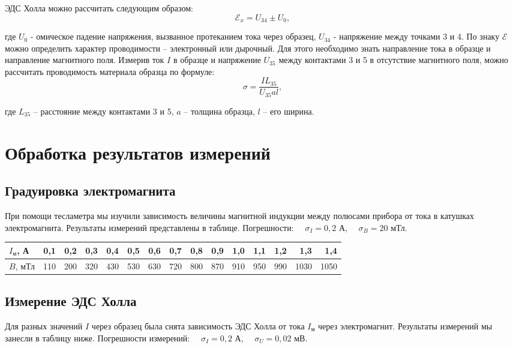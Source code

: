 \n
ЭДС Холла можно рассчитать следующим образом:
\[\mathcal{E}_x = U_{34} \pm U_0,\]

где $U_0$ - омическое падение напряжения, вызванное протеканием тока через образец, $U_{34}$ - напряжение между точками 3 и 4.
\n\n
По знаку $ \mathcal{E} $ можно определить характер проводимости -- электронный или дырочный. Для этого необходимо знать направление тока в образце и направление магнитного поля.
\n\n
Измерив ток $ I $ в образце и напряжение $ U_{35} $ между контактами 3 и 5 в отсутствие магнитного поля, можно рассчитать проводимость материала образца по формуле:
\begin{equation}\label{2}
\sigma = \frac{IL_{35}}{U_{35}al},
\end{equation}

где $ L_{35} $ -- расстояние между контактами 3 и 5, $ a $ -- толщина образца, $ l $ -- его ширина.

\section*{Обработка результатов измерений}

\subsection*{Градуировка электромагнита}

При помощи тесламетра мы изучили зависимость величины магнитной индукции между полюсами прибора от тока в катушках электромагнита. Результаты измерений представлены в таблице. Погрешности: $ \quad \sigma_{I} = 0,2$ А, $ \quad \sigma_{B} = 20$ мТл.

\begin{table}[H]
	\centering
	\begin{tabular}{|l|r|r|r|r|r|r|r|r|r|r|r|r|r|r|}
		\hline
		$ I_\text{м} $, А & 0,1 & 0,2 & 0,3 & 0,4 & 0,5 & 0,6 & 0,7 & 0,8 & 0,9 & 1,0 & 1,1 & 1,2 & 1,3 & 1,4 \\ \hline
		$ B $, мТл & 110 & 200 & 320 & 430 & 530 & 630 & 720 & 800 & 870 & 910 & 950 & 990 & 1030 & 1050 \\ \hline
	\end{tabular}
\end{table}
\subsection*{Измерение ЭДС Холла}

Для разных значений $ I $ через образец была снята зависимость ЭДС Холла от тока $ I_\text{м} $ через электромагнит. Результаты измерений мы занесли в таблицу ниже. Погрешности измерений: $ \quad \sigma_{I} = 0,2$ А, $ \quad \sigma_{U} = 0,02$ мВ.

